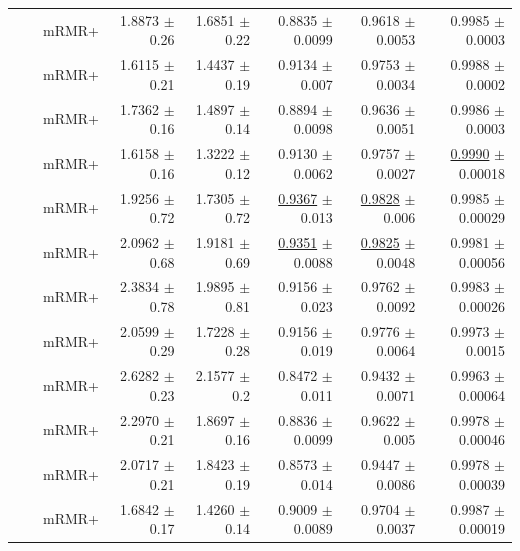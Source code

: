 \begin{longtable}{llp{}rrrrr}
 &  & mRMR+ & 1.8873 {\scriptsize $\pm$ 0.26} & 1.6851 {\scriptsize $\pm$ 0.22} & 0.8835 {\scriptsize $\pm$ 0.0099} & 0.9618 {\scriptsize $\pm$ 0.0053} & 0.9985 {\scriptsize $\pm$ 0.0003} \\
 &  & mRMR+ & 1.6115 {\scriptsize $\pm$ 0.21} & 1.4437 {\scriptsize $\pm$ 0.19} & 0.9134 {\scriptsize $\pm$ 0.007} & 0.9753 {\scriptsize $\pm$ 0.0034} & 0.9988 {\scriptsize $\pm$ 0.0002} \\
 &  & mRMR+ & 1.7362 {\scriptsize $\pm$ 0.16} & 1.4897 {\scriptsize $\pm$ 0.14} & 0.8894 {\scriptsize $\pm$ 0.0098} & 0.9636 {\scriptsize $\pm$ 0.0051} & 0.9986 {\scriptsize $\pm$ 0.0003} \\
 &  & mRMR+ & 1.6158 {\scriptsize $\pm$ 0.16} & 1.3222 {\scriptsize $\pm$ 0.12} & 0.9130 {\scriptsize $\pm$ 0.0062} & 0.9757 {\scriptsize $\pm$ 0.0027} & \underline{0.9990} {\scriptsize $\pm$ 0.00018} \\
 &  & mRMR+ & 1.9256 {\scriptsize $\pm$ 0.72} & 1.7305 {\scriptsize $\pm$ 0.72} & \underline{0.9367} {\scriptsize $\pm$ 0.013} & \underline{0.9828} {\scriptsize $\pm$ 0.006} & 0.9985 {\scriptsize $\pm$ 0.00029} \\
 &  & mRMR+ & 2.0962 {\scriptsize $\pm$ 0.68} & 1.9181 {\scriptsize $\pm$ 0.69} & \underline{0.9351} {\scriptsize $\pm$ 0.0088} & \underline{0.9825} {\scriptsize $\pm$ 0.0048} & 0.9981 {\scriptsize $\pm$ 0.00056} \\
 &  & mRMR+ & 2.3834 {\scriptsize $\pm$ 0.78} & 1.9895 {\scriptsize $\pm$ 0.81} & 0.9156 {\scriptsize $\pm$ 0.023} & 0.9762 {\scriptsize $\pm$ 0.0092} & 0.9983 {\scriptsize $\pm$ 0.00026} \\
 &  & mRMR+ & 2.0599 {\scriptsize $\pm$ 0.29} & 1.7228 {\scriptsize $\pm$ 0.28} & 0.9156 {\scriptsize $\pm$ 0.019} & 0.9776 {\scriptsize $\pm$ 0.0064} & 0.9973 {\scriptsize $\pm$ 0.0015} \\
 &  & mRMR+ & 2.6282 {\scriptsize $\pm$ 0.23} & 2.1577 {\scriptsize $\pm$ 0.2} & 0.8472 {\scriptsize $\pm$ 0.011} & 0.9432 {\scriptsize $\pm$ 0.0071} & 0.9963 {\scriptsize $\pm$ 0.00064} \\
 &  & mRMR+ & 2.2970 {\scriptsize $\pm$ 0.21} & 1.8697 {\scriptsize $\pm$ 0.16} & 0.8836 {\scriptsize $\pm$ 0.0099} & 0.9622 {\scriptsize $\pm$ 0.005} & 0.9978 {\scriptsize $\pm$ 0.00046} \\
 &  & mRMR+ & 2.0717 {\scriptsize $\pm$ 0.21} & 1.8423 {\scriptsize $\pm$ 0.19} & 0.8573 {\scriptsize $\pm$ 0.014} & 0.9447 {\scriptsize $\pm$ 0.0086} & 0.9978 {\scriptsize $\pm$ 0.00039} \\
 &  & mRMR+ & 1.6842 {\scriptsize $\pm$ 0.17} & 1.4260 {\scriptsize $\pm$ 0.14} & 0.9009 {\scriptsize $\pm$ 0.0089} & 0.9704 {\scriptsize $\pm$ 0.0037} & 0.9987 {\scriptsize $\pm$ 0.00019} \\

\end{longtable}
